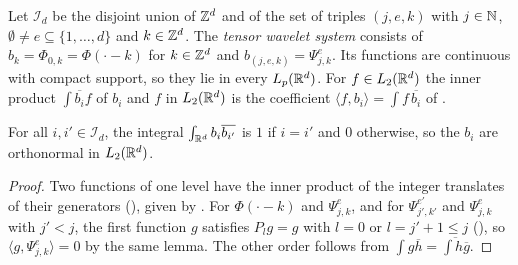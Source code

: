 \begin{definition}
\label{def:daub-rd-system}
\leanok
{}
Let $\mathcal{I}_d$ be the disjoint union of $\mathbb{Z}^d$ and of the set of triples $(j, e, k)$ with
$j \in \mathbb{N}$, $\emptyset \neq e \subseteq \{1, \dots, d\}$ and $k \in \mathbb{Z}^d$. The \emph{tensor
wavelet system} consists of $b_k = \Phi_{0,k} = \Phi(\cdot - k)$ for $k \in \mathbb{Z}^d$ and
$b_{(j,e,k)} = \Psi^e_{j,k}$. Its functions are continuous with compact support, so they lie in
every $L_p(\mathbb{R}^d)$. For $f \in L_2(\mathbb{R}^d)$ the inner product $\int \overline{b_i} f$ of $b_i$ and
$f$ in $L_2(\mathbb{R}^d)$ is the coefficient $\langle f, b_i \rangle = \int f \, \overline{b_i}$ of
.
\end{definition}

\begin{proposition}
\label{prop:daub-rd-system-orthonormal}
\leanok
{}
For all $i, i' \in \mathcal{I}_d$, the integral $\int_{\mathbb{R}^d} b_i \overline{b_{i'}}$ is $1$ if
$i = i'$ and $0$ otherwise, so the $b_i$ are orthonormal in $L_2(\mathbb{R}^d)$.
\end{proposition}

\begin{proof}
\leanok
{}
Two functions of one level have the inner product of the integer translates of their generators
(), given by . For
$\Phi(\cdot - k)$ and $\Psi^e_{j,k}$, and for $\Psi^{e'}_{j',k'}$ and $\Psi^e_{j,k}$ with
$j' < j$, the first function $g$ satisfies $P_l g = g$ with $l = 0$ or $l = j' + 1 \leq j$
(), so $\langle g, \Psi^e_{j,k} \rangle = 0$ by the same lemma. The
other order follows from $\int g \overline{h} = \overline{\int h \overline{g}}$.
\end{proof}

